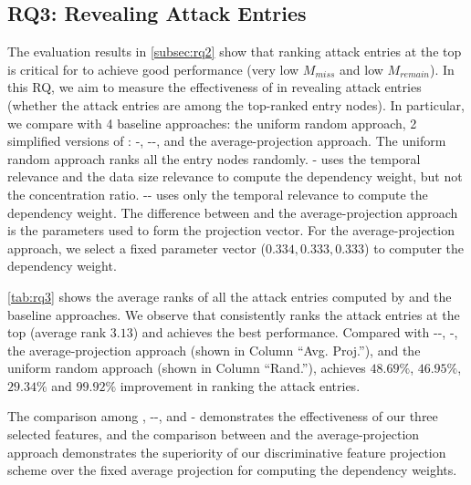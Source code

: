 
%


\subsection{RQ3: Revealing Attack Entries}
\label{subsec:rq3}

The evaluation results in \cref{subsec:rq2} show that ranking attack entries at the top is critical for \tool to achieve good performance (very low $M_{miss}$ and low $M_{remain}$).
%
In this RQ, we aim to measure the effectiveness of \tool in revealing attack entries (\ie whether the attack entries are among the top-ranked entry nodes).
In particular, we compare \tool with 4 baseline approaches: the uniform random approach, 2 simplified versions of \tool: \tool-, \tool-{}-, and the average-projection approach.
The uniform random approach ranks all the entry nodes randomly.
\tool- uses the temporal relevance and the data size relevance to compute the dependency weight, but not the concentration ratio.
\tool-{}- uses only the temporal relevance to compute the  dependency weight.
The difference between \tool and the average-projection approach is the parameters used to
form the projection vector. 
For the average-projection approach, we select a fixed parameter vector ($0.334, 0.333, 0.333$) to computer the dependency weight. %


\cref{tab:rq3} shows the average ranks of all the attack entries computed by \tool and the baseline approaches.
We observe that \tool consistently ranks the attack entries at the top (average rank $3.13$) and achieves the best performance.
%
Compared with \tool-{}-, \tool-, the average-projection approach (shown in Column ``Avg. Proj.''), and the uniform random approach (shown in Column ``Rand.''), \tool achieves $48.69\%$, $46.95\%$, $29.34\%$ and $99.92\%$ improvement in ranking the attack entries.

The comparison among \tool, \tool-{}-, and \tool- demonstrates the effectiveness of our three selected features,
and the comparison between \tool and the average-projection approach demonstrates the superiority of our discriminative feature projection scheme over the fixed average projection for computing the dependency weights. 



